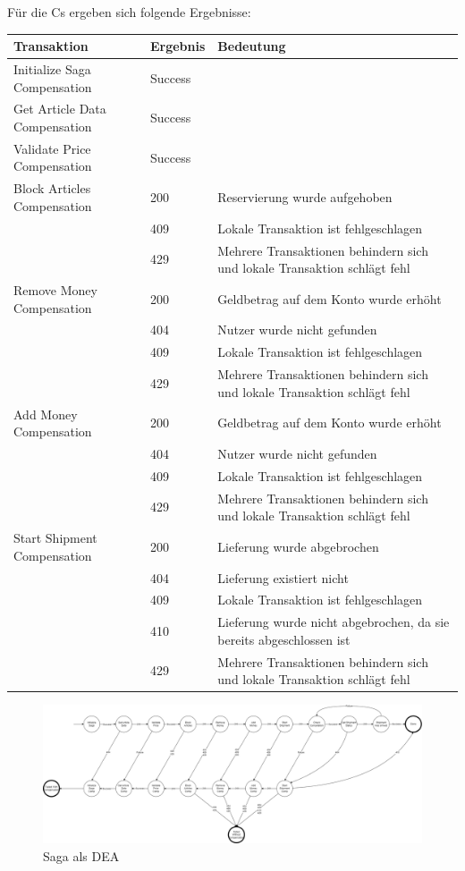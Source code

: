 Für die Cs ergeben sich folgende Ergebnisse:
\begin{center}
	\begin{tabular}[h]{|p{5.5cm}|p{1.5cm}|p{8.5cm}|}
		\hline
		Transaktion 						& Ergebnis 	& Bedeutung \\ \hline
		Initialize Saga Compensation	 	& Success 	& \\ \hline
		Get Article Data Compensation	 	& Success 	& \\ \hline	
		Validate Price Compensation	 		& Success 	& \\ \hline
		Block Articles Compensation	 		& 200	 	& Reservierung wurde aufgehoben \\
											& 409		& Lokale Transaktion ist fehlgeschlagen \\
											& 429 		& Mehrere Transaktionen behindern sich und lokale Transaktion schlägt fehl \\ \hline
		Remove Money Compensation		 		& 200		& Geldbetrag auf dem Konto wurde erhöht \\
											& 404		& Nutzer wurde nicht gefunden \\
											& 409		& Lokale Transaktion ist fehlgeschlagen \\
											& 429		& Mehrere Transaktionen behindern sich und lokale Transaktion schlägt fehl \\ \hline
		Add Money Compensation		 		& 200		& Geldbetrag auf dem Konto wurde erhöht \\
											& 404		& Nutzer wurde nicht gefunden \\
											& 409		& Lokale Transaktion ist fehlgeschlagen \\
											& 429		& Mehrere Transaktionen behindern sich und lokale Transaktion schlägt fehl \\ \hline
		Start Shipment Compensation	 		& 200	 	& Lieferung wurde abgebrochen \\
			 								& 404		& Lieferung existiert nicht \\
											& 409		& Lokale Transaktion ist fehlgeschlagen \\
											& 410		& Lieferung wurde nicht abgebrochen, da sie bereits abgeschlossen ist \\
											& 429		& Mehrere Transaktionen behindern sich und lokale Transaktion schlägt fehl \\ \hline
	\end{tabular}
\end{center}
\FloatBarrier

\begin{figure}[h!]
	\centering
	\includegraphics[width=\linewidth]{figures/DatabaseER/DEA_No_NetworkErrors_No_Retries.png}
	\caption{Saga als DEA}
\end{figure}
\FloatBarrier


